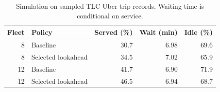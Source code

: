 \begin{table}[htbp]
\centering
\small
\caption{Simulation on sampled TLC Uber trip records. Waiting time is conditional on service.}
\label{tab:dispatch_results}
\begin{tabular}{rlrrr}
\hline
Fleet & Policy & Served (\%) & Wait (min) & Idle (\%) \\
\hline
8 & Baseline & 30.7 & 6.98 & 69.6 \\
8 & Selected lookahead & 34.5 & 7.02 & 65.9 \\
12 & Baseline & 41.7 & 6.90 & 71.9 \\
12 & Selected lookahead & 46.5 & 6.94 & 68.7 \\
\hline
\end{tabular}
\end{table}